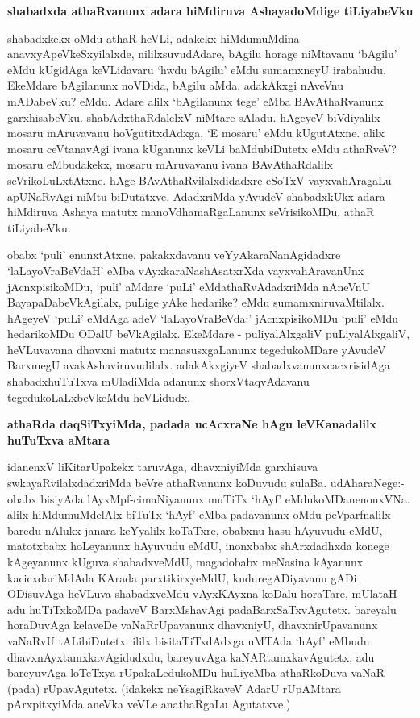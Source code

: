 {\bigskip
\noindent
{\large\bf shabadxda athaRvanunx adara hiMdiruva AshayadoMdige tiLiyabeVku}}\label{page179a}
\medskip

\noindent
shabadxkekx oMdu athaR heVLi, adakekx hiMdumuMdina anavxyApeVkeSxyilalxde, nililxsuvudAdare, bAgilu horage niMtavanu `bAgilu' eMdu kUgidAga keVLidavaru `hwdu bAgilu' eMdu sumamxneyU irabahudu. EkeMdare bAgilanunx noVDida, bAgilu aMda, adakAkxgi nAveVnu mADabeVku? eMdu. Adare alilx `bAgilanunx tege' eMba BAvAthaRvanunx garxhisabeVku. shabAdxthaRdalelxV niMtare sAladu. hAgeyeV biVdiyalilx mosaru mAruvavanu hoVgutitxdAdxga, `E mosaru' eMdu kUgutAtxne. alilx mosaru ceVtanavAgi ivana kUganunx keVLi baMdubiDutetx eMdu athaRveV? mosaru eMbudakekx, mosaru mAruvavanu ivana BAvAthaRdalilx seVrikoLuLxtAtxne. hAge BAvAthaRvilalxdidadxre eSoTxV vayxvahAragaLu apUNaRvAgi niMtu biDutatxve. AdadxriMda yAvudeV shabadxkUkx adara hiMdiruva Ashaya matutx manoVdhamaRgaLanunx seVrisikoMDu, athaR tiLiyabeVku.

obabx `puli' enunxtAtxne. pakakxdavanu veYyAkaraNanAgidadxre `laLayoVraBeVdaH' eMba vAyxkaraNashAsatxrXda vayxvahAravanUnx jAcnxpisikoMDu, `puli' aMdare `puLi' eMdathaRvAdadxriMda nAneVnU BayapaDabeVkAgilalx, puLige yAke hedarike? eMdu sumamxniruvaMtilalx. hAgeyeV `puLi' eMdAga adeV `laLayoVraBeVda:' jAcnxpisikoMDu `puli' eMdu hedarikoMDu ODalU beVkAgilalx. EkeMdare - puliyalAlxgaliV puLiyalAlxgaliV, heVLuvavana dhavxni matutx manasusxgaLanunx tegedukoMDare yAvudeV BarxmegU avakAshaviruvudilalx. adakAkxgiyeV shabadxvanunxcacxrisidAga shabadxhuTuTxva mUladiMda adanunx shorxVtaqvAdavanu tegedukoLaLxbeVkeMdu heVLidudx.

{\bigskip
\noindent
{\large\bf athaRda daqSiTxyiMda, padada ucAcxraNe hAgu leVKanadalilx huTuTxva aMtara}}\label{page180}
\medskip

\noindent
idanenxV liKitarUpakekx taruvAga, dhavxniyiMda garxhisuva swkayaRvilalxdadxriMda beVre athaRvanunx koDuvudu sulaBa. udAharaNege:- obabx bisiyAda lAyxMpf-cimaNiyanunx muTiTx `hAyf' eMdukoMDanenonxVNa. alilx hiMdumuMdelAlx biTuTx `hAyf' eMba padavanunx oMdu peVparfnalilx baredu nAlukx janara keYyalilx koTaTxre, obabxnu hasu hAyuvudu eMdU, matotxbabx hoLeyanunx hAyuvudu eMdU, inonxbabx shArxdadhxda konege kAgeyanunx kUguva shabadxveMdU, magadobabx meNasina kAyanunx kacicxdariMdAda KArada parxtikirxyeMdU, kuduregADiyavanu gADi ODisuvAga heVLuva shabadxveMdu vAyxKAyxna koDalu horaTare, mUlataH adu huTiTxkoMDa padaveV BarxMshavAgi padaBarxSaTxvAgutetx. bareyalu horaDuvAga kelaveDe vaNaRrUpavanunx dhavxniyU, dhavxnirUpavanunx vaNaRvU tALibiDutetx. ililx bisitaTiTxdAdxga uMTAda `hAyf' eMbudu dhavxnAyxtamxkavAgidudxdu, bareyuvAga kaNARtamxkavAgutetx, adu bareyuvAga loTeTxya rUpakaLedukoMDu  huLiyeMba athaRkoDuva vaNaR (pada) rUpavAgutetx. (idakekx neYsagiRkaveV AdarU rUpAMtara pArxpitxyiMda aneVka veVLe anathaRgaLu Agutatxve.) 

